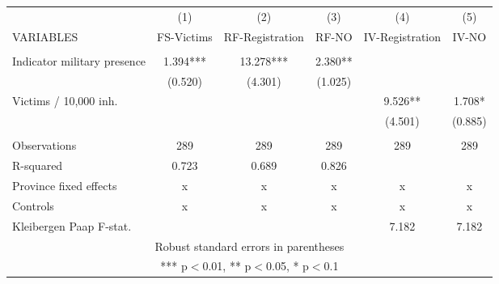 \begin{tabular}{lccccc} \hline
 & (1) & (2) & (3) & (4) & (5) \\
VARIABLES & FS-Victims & RF-Registration & RF-NO & IV-Registration & IV-NO \\ \hline
 &  &  &  &  &  \\
Indicator military presence & 1.394*** & 13.278*** & 2.380** &  &  \\
 & (0.520) & (4.301) & (1.025) &  &  \\
Victims / 10,000 inh. &  &  &  & 9.526** & 1.708* \\
 &  &  &  & (4.501) & (0.885) \\
 &  &  &  &  &  \\
Observations & 289 & 289 & 289 & 289 & 289 \\
R-squared & 0.723 & 0.689 & 0.826 &  &  \\
Province fixed effects & x & x & x & x & x \\
Controls & x & x & x & x & x \\
 Kleibergen Paap F-stat. &  &  &  & 7.182 & 7.182 \\ \hline
\multicolumn{6}{c}{ Robust standard errors in parentheses} \\
\multicolumn{6}{c}{ *** p$<$0.01, ** p$<$0.05, * p$<$0.1} \\
\end{tabular}
